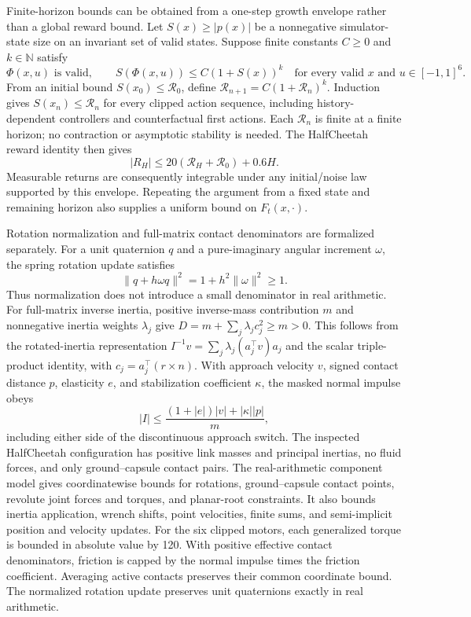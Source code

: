 Finite-horizon bounds can be obtained from a one-step growth envelope rather than a global reward bound.
Let $S(x)\ge|p(x)|$ be a nonnegative simulator-state size on an invariant set of valid states.
Suppose finite constants $C\ge0$ and $k\in\mathbb N$ satisfy
\begin{equation}
 \Phi(x,u)\text{ is valid},\qquad
 S(\Phi(x,u))\le C(1+S(x))^k
 \quad\text{for every valid }x\text{ and }u\in[-1,1]^6.
 \label{eq:spring_growth_obligation}
\end{equation}
From an initial bound $S(x_0)\le\mathcal R_0$, define $\mathcal R_{n+1}=C(1+\mathcal R_n)^k$.
Induction gives $S(x_n)\le\mathcal R_n$ for every clipped action sequence, including history-dependent controllers and counterfactual first actions.
Each $\mathcal R_n$ is finite at a finite horizon; no contraction or asymptotic stability is needed.
The HalfCheetah reward identity then gives
\begin{equation}
 |R_H|\le20(\mathcal R_H+\mathcal R_0)+0.6H.
\end{equation}
Measurable returns are consequently integrable under any initial/noise law supported by this envelope.
Repeating the argument from a fixed state and remaining horizon also supplies a uniform bound on $F_t(x,\cdot)$.

Rotation normalization and full-matrix contact denominators are formalized separately.
For a unit quaternion $q$ and a pure-imaginary angular increment $\omega$, the spring rotation update satisfies
\begin{equation}
 \|q+h\omega q\|^2=1+h^2\|\omega\|^2\ge1.
\end{equation}
Thus normalization does not introduce a small denominator in real arithmetic.
For full-matrix inverse inertia, positive inverse-mass contribution $m$ and nonnegative inertia weights $\lambda_j$ give
$D=m+\sum_j\lambda_j c_j^2\ge m>0$.
This follows from the rotated-inertia representation $I^{-1}v=\sum_j\lambda_j(a_j^\top v)a_j$ and the scalar triple-product identity, with $c_j=a_j^\top(r\times n)$.
With approach velocity $v$, signed contact distance $p$, elasticity $e$, and stabilization coefficient $\kappa$, the masked normal impulse obeys
\begin{equation}
 |I|\le \frac{(1+|e|)|v|+|\kappa||p|}{m},
\end{equation}
including either side of the discontinuous approach switch.
The inspected HalfCheetah configuration has positive link masses and principal inertias, no fluid forces, and only ground--capsule contact pairs.
The real-arithmetic component model gives coordinatewise bounds for rotations, ground--capsule contact points, revolute joint forces and torques, and planar-root constraints.
It also bounds inertia application, wrench shifts, point velocities, finite sums, and semi-implicit position and velocity updates.
For the six clipped motors, each generalized torque is bounded in absolute value by 120.
With positive effective contact denominators, friction is capped by the normal impulse times the friction coefficient.
Averaging active contacts preserves their common coordinate bound.
The normalized rotation update preserves unit quaternions exactly in real arithmetic.

